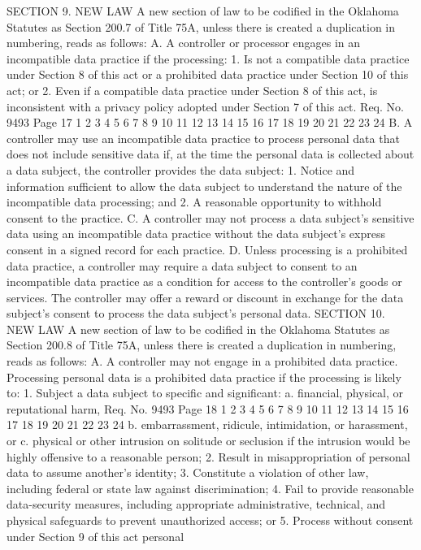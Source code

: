 SECTION 9. NEW LAW A new section of law to be codified
in the Oklahoma Statutes as Section 200.7 of Title 75A, unless there
is created a duplication in numbering, reads as follows:
A. A controller or processor engages in an incompatible data
practice if the processing:
1. Is not a compatible data practice under Section 8 of this act
or a prohibited data practice under Section 10 of this act; or
2. Even if a compatible data practice under Section 8 of this
act, is inconsistent with a privacy policy adopted under Section 7 of
this act.
Req. No. 9493 Page 17
1
2
3
4
5
6
7
8
9
10
11
12
13
14
15
16
17
18
19
20
21
22
23
24
B. A controller may use an incompatible data practice to process
personal data that does not include sensitive data if, at the time the
personal data is collected about a data subject, the controller
provides the data subject:
1. Notice and information sufficient to allow the data subject to
understand the nature of the incompatible data processing; and
2. A reasonable opportunity to withhold consent to the practice.
C. A controller may not process a data subject's sensitive data
using an incompatible data practice without the data subject's express
consent in a signed record for each practice.
D. Unless processing is a prohibited data practice, a
controller may require a data subject to consent to an incompatible
data practice as a condition for access to the controller's goods or
services. The controller may offer a reward or discount in exchange
for the data subject's consent to process the data subject's
personal data.
SECTION 10. NEW LAW A new section of law to be codified
in the Oklahoma Statutes as Section 200.8 of Title 75A, unless there
is created a duplication in numbering, reads as follows:
A. A controller may not engage in a prohibited data practice.
Processing personal data is a prohibited data practice if the
processing is likely to:
1. Subject a data subject to specific and significant:
a. financial, physical, or reputational harm,
Req. No. 9493 Page 18
1
2
3
4
5
6
7
8
9
10
11
12
13
14
15
16
17
18
19
20
21
22
23
24
b. embarrassment, ridicule, intimidation, or harassment, or
c. physical or other intrusion on solitude or seclusion if
the intrusion would be highly offensive to a reasonable
person;
2. Result in misappropriation of personal data to assume
another's identity;
3. Constitute a violation of other law, including federal or state
law against discrimination;
4. Fail to provide reasonable data-security measures, including
appropriate administrative, technical, and physical safeguards to
prevent unauthorized access; or
5. Process without consent under Section 9 of this act personal
